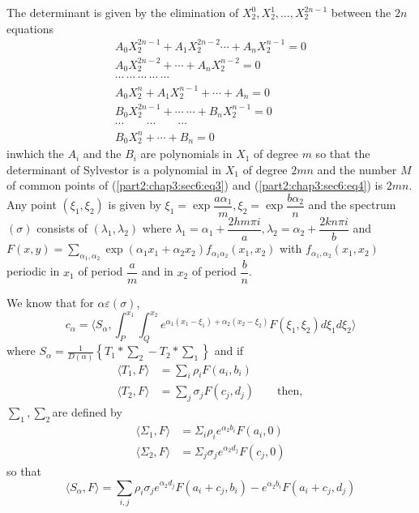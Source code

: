 The determinant is given by the elimination of $X^0_2,  X^1_2,
\ldots,  X^{2n-1}_2$ between the $2n$ equations 
\begin{gather*}
  A_0 X^{2n-1}_2 + A_1 X^{2n-2}_2 \cdots + A_n X^{n-1}_2 = 0\\
  A_0 X^{2n-2}_2 + \cdots + A_n X_2^{n-2} = 0\\
  \cdots ~ \cdots ~ \cdots ~ \cdots ~ \cdots\\
  A_0 X^n_2 + A_1 X^{n-1}_2 + \cdots + A_n = 0\\
  B_0 X^{2n-1}_2 + \cdots ~ \cdots + B_n X^{n-1}_2 = 0\\
  \cdots \qquad \cdots \qquad \cdots \\
  B_0 X^{n}_2 + \cdots + B_n = 0
\end{gather*}
in\pageoriginale which the $A_i$ and the $B_i$ are polynomials in $X_1$ of degree
$m$ so that the determinant of Sylvestor is a polynomial in $X_1$ of
degree $2mn$ and the number $M$ of common points of
(\ref{part2:chap3:sec6:eq3}) and (\ref{part2:chap3:sec6:eq4}) is 
$2mn$. Any point $(\xi_1,  \xi_2)$ is given by $\xi_1 = \exp\dfrac{a
  \alpha_1}{m}, \xi_2 =\exp \dfrac{b \alpha_2}{n}$ and the spectrum
$(\sigma)$ consists of $(\lambda_1,  \lambda_2)$ where $\lambda_1 =
\alpha_1 + \dfrac{2hm \pi i} {a},  \lambda_2 = \alpha_2 + \dfrac{2kn
  \pi i} {b}$ and $F(x, y)= \sum \limits_{\alpha_1,  \alpha_2}
\exp(\alpha_1 x_1 + \alpha_2 x_2)f_{\alpha_1 \alpha_2} (x_1,  x_2)$
with $f_{\alpha_1,  \alpha_2} (x_1,  x_2)$ periodic in $x_1$ of period
$\dfrac{a}{m}$ and in $x_2$ of period $\dfrac{b}{n}$. 

We know that for $\alpha \varepsilon  (\sigma)$,
$$
c_\alpha = \langle S_\alpha,  \int^{x_1}_P \int^{x_2}_Q e^{\alpha_1
  (x_1 - \xi_1) + \alpha_2 (x_2 - \xi_2)} F(\xi_1,  \xi_2) d \xi_1 d
\xi_2 \rangle 
$$
where $S_\alpha = \frac{1}{D(\alpha)} \left\{ T_1 * \sum_2 - T_2 *
\sum_1 \right\}$ and if  
\begin{align*}
  \langle T_1, F \rangle &= \sum_i \rho_i F(a_i,  b_i)\\
  \langle T_2, F \rangle &= \sum_j \sigma_j F(c_j,  d_j) \qquad \text{then},
\end{align*}
$\sum_1, \sum_2$\pageoriginale are defined by
\begin{align*}
  \langle \Sigma_1,  F \rangle & = \Sigma_i \rho_i e^{\alpha_2 b_i} F(a_i,  0)\\
  \langle \Sigma_2,  F \rangle & =\Sigma_j \sigma_j e^{\alpha_2 d_j} F(c_j,  0)
\end{align*}
so that
$$
\langle S_\alpha,  F \rangle = \sum_{i, j} \rho_i \sigma_j e^{\alpha_2
  d_j} F(a_i + c_j,  b_i) - e^{\alpha_2 b_i} F(a_i + c_j,  d_j) 
$$


